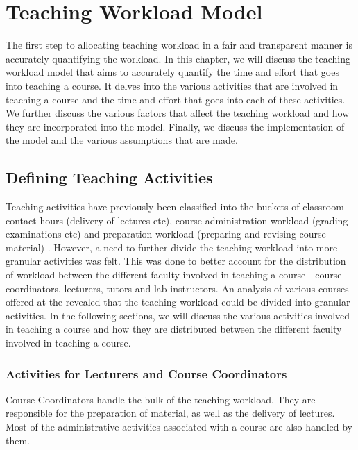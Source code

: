 \chapter{Teaching Workload Model}

The first step to allocating teaching workload in a fair and transparent manner is accurately quantifying the workload. In this chapter, we will discuss the teaching workload model that aims to accurately quantify the time and effort that goes into teaching a course. It delves into the various activities that are involved in teaching a course and the time and effort that goes into each of these activities. We further discuss the various factors that affect the teaching workload and how they are incorporated into the model. Finally, we discuss the implementation of the model and the various assumptions that are made.

\section{Defining Teaching Activities}

Teaching activities have previously been classified into the buckets of classroom contact hours (delivery of lectures etc), course administration workload (grading examinations etc) and preparation workload (preparing and revising course material) \cite{griffith2020framework}. However, a need to further divide the teaching workload into more granular activities was felt. This was done to better account for the distribution of workload between the different faculty involved in teaching a course - course coordinators, lecturers, tutors and lab instructors. An analysis of various courses offered at the \deptname revealed that the teaching workload could be divided into granular activities. In the following sections, we will discuss the various activities involved in teaching a course and how they are distributed between the different faculty involved in teaching a course.

\subsection{Activities for Lecturers and Course Coordinators}
\label{sec:activities_for_lecturers}

Course Coordinators handle the bulk of the teaching workload. They are responsible for the preparation of material, as well as  the delivery of lectures. Most of the administrative activities associated with a course are also handled by them.

